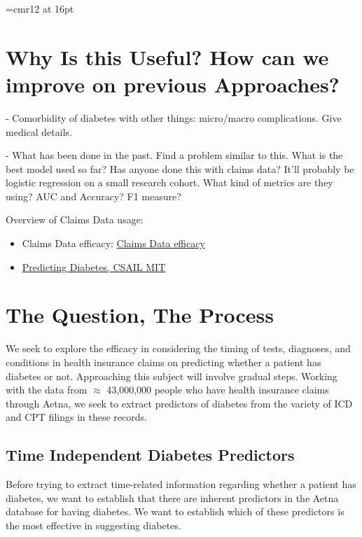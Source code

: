 \documentclass{article}
\begin{document}
\font\myfont=cmr12 at 16pt
\maketitle


\section{Why Is this Useful? How can we improve on previous Approaches?}

- Comorbidity of diabetes with other things: micro/macro complications. Give medical details.

- What has been done in the past. Find a problem similar to this. What is the best model used so far? Has anyone done this with claims data? It'll probably be logistic regression on a small research cohort. What kind of metrics are they using? AUC and Accuracy? F1 measure?


Overview of Claims Data usage:
\begin{itemize}
\item Claims Data efficacy: \href{https://www.rand.org/content/dam/rand/pubs/rgs_dissertations/RGSD171/RGSD171.ch2.pdf}{Claims Data efficacy}

\item \href{http://people.csail.mit.edu/rahulgk/papers/nips2013\_workshop.pdf}{Predicting Diabetes, CSAIL MIT}

\end{itemize}

\section{The Question, The Process}
\doublespacing

We seek to explore the efficacy in considering the timing of tests, diagnoses, and conditions in health insurance claims on predicting whether a patient has diabetes or not. Approaching this subject will involve gradual steps. Working with the data from $\approx$ 43,000,000 people who have health insurance claims through Aetna, we seek to extract predictors of diabetes from the variety of ICD and CPT filings in these records. 
 

\subsection{Time Independent Diabetes Predictors}

Before trying to extract time-related information regarding whether a patient has diabetes, we want to establish that there are inherent predictors in the Aetna database for having diabetes. We want to establish which of these predictors is the most effective in suggesting diabetes. 
\end{document}
